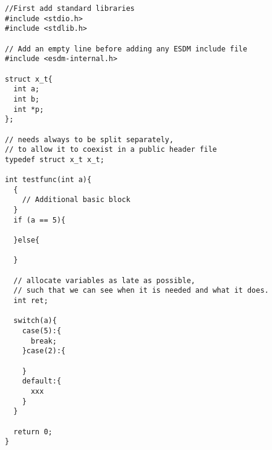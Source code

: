 \begin{lstlisting}
//First add standard libraries
#include <stdio.h>
#include <stdlib.h>

// Add an empty line before adding any ESDM include file
#include <esdm-internal.h>

struct x_t{
  int a;
  int b;
  int *p;
};

// needs always to be split separately, 
// to allow it to coexist in a public header file
typedef struct x_t x_t; 

int testfunc(int a){
  {
    // Additional basic block
  }
  if (a == 5){

  }else{

  }

  // allocate variables as late as possible, 
  // such that we can see when it is needed and what it does.
  int ret;

  switch(a){
    case(5):{
      break;
    }case(2):{

    }
    default:{
      xxx
    }
  }

  return 0;
}
\end{lstlisting}
